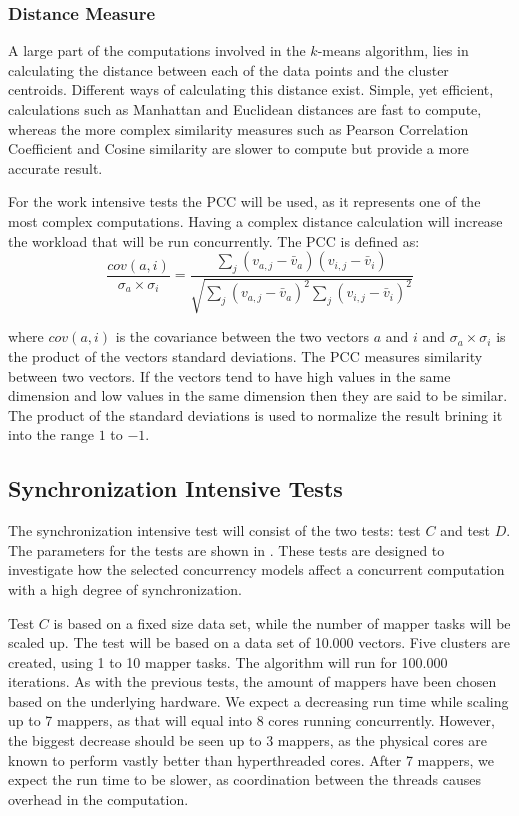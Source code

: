\subsubsection{Distance Measure}
A large part of the computations involved in the $k$-means algorithm, lies in calculating the distance between each of the data points and the cluster centroids. Different ways of calculating this distance exist. Simple, yet efficient, calculations such as Manhattan and Euclidean\cite[p. 41]{amatriain2011data} distances are fast to compute, whereas the more complex similarity measures such as Pearson Correlation Coefficient and Cosine similarity\cite[p. 42]{amatriain2011data}\cite{breese1998empirical} are slower to compute but provide a more accurate result.

For the work intensive tests the \ac{PCC} will be used, as it represents one of the most complex computations. Having a complex distance calculation will increase the workload that will be run concurrently. The \ac{PCC} is defined as\cite[p. 4]{breese1998empirical}:
\begin{equation}\label{pearsonverbose}
\frac{cov(a,i)}{\sigma_a \times \sigma_i} = \frac{\sum_j(v_{a,j}-\bar{v}_a)(v_{i,j}-\bar{v}_i)}{\sqrt{{\sum_j}(v_{a,j}-\bar{v}_a)^2 \sum_j(v_{i,j}-\bar{v}_i)^2}}
\end{equation}

where $cov(a,i)$ is the covariance between the two vectors $a$ and $i$ and $\sigma_a \times \sigma_i$ is the product of the vectors standard deviations. The \ac{PCC} measures similarity between two vectors. If the vectors tend to have high values in the same dimension and low values in the same dimension then they are said to be similar. The product of the standard deviations is used to normalize the result brining it into the range $1$ to $-1$. 

\subsection{Synchronization Intensive Tests}
The synchronization intensive test will consist of the two tests: test $C$ and test $D$. The parameters for the tests are shown in . These tests are designed to investigate how the selected concurrency models affect a concurrent computation with a high degree of synchronization. 

Test $C$ is based on a fixed size data set, while the number of mapper tasks will be scaled up.  The test will be based on a data set of 10.000 vectors. Five clusters are created, using 1 to 10 mapper tasks. The algorithm will run for 100.000 iterations. As with the previous tests, the amount of mappers have been chosen based on the underlying hardware. We expect a decreasing run time while scaling up to 7 mappers, as that will equal into 8 cores running concurrently. However, the biggest decrease should be seen up to 3 mappers, as the physical cores are known to perform vastly better than hyperthreaded cores. After 7 mappers, we expect the run time to be slower, as coordination between the threads causes overhead in the computation.

